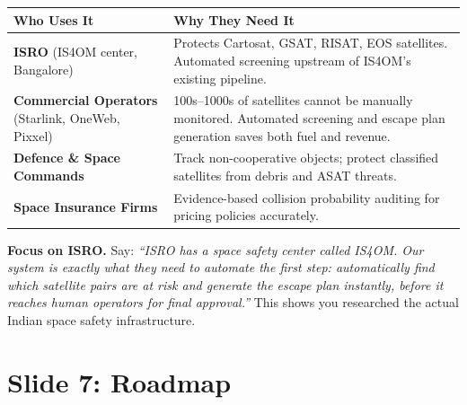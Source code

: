 \documentclass[11pt,a4paper]{article}
\begin{document}
\begin{tcolorbox}[colback=lightgray, colframe=gray!30]
\renewcommand{\arraystretch}{1.3}
\begin{tabularx}{\linewidth}{@{}p{4cm}X@{}}
\toprule
\textbf{Who Uses It} & \textbf{Why They Need It} \\
\midrule
\rowcolor{white}
\textbf{ISRO} (IS4OM center, Bangalore) & Protects Cartosat, GSAT, RISAT, EOS satellites. Automated screening upstream of IS4OM's existing pipeline. \\[4pt]
\rowcolor{lightgray}
\textbf{Commercial Operators} (Starlink, OneWeb, Pixxel) & 100s--1000s of satellites cannot be manually monitored. Automated screening and escape plan generation saves both fuel and revenue. \\[4pt]
\rowcolor{white}
\textbf{Defence \& Space Commands} & Track non-cooperative objects; protect classified satellites from debris and ASAT threats. \\[4pt]
\rowcolor{lightgray}
\textbf{Space Insurance Firms} & Evidence-based collision probability auditing for pricing policies accurately. \\
\bottomrule
\end{tabularx}
\end{tcolorbox}

\begin{presenterbox}
\textbf{Focus on ISRO.} Say: \textit{``ISRO has a space safety center called IS4OM. Our system is exactly what they need to automate the first step: automatically find which satellite pairs are at risk and generate the escape plan instantly, before it reaches human operators for final approval.''} This shows you researched the actual Indian space safety infrastructure.
\end{presenterbox}

\newpage
\section{Slide 7: Roadmap}
\end{document}
